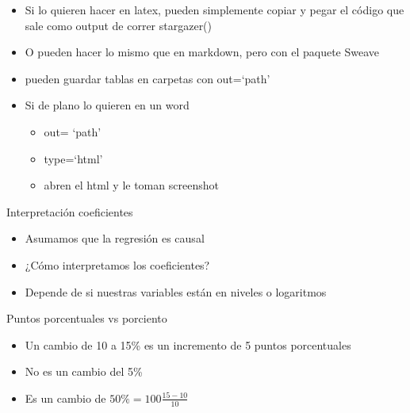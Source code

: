 \documentclass[
  ignorenonframetext,
]{beamer}
\providecommand{\tightlist}{%
  \setlength{\itemsep}{0pt}\setlength{\parskip}{0pt}}
\begin{document}
\begin{frame}{}
\protect\hypertarget{section-44}{}
\begin{itemize}
\tightlist
\item
  Si lo quieren hacer en latex, pueden simplemente copiar y pegar el
  código que sale como output de correr stargazer()
\item
  O pueden hacer lo mismo que en markdown, pero con el paquete Sweave
\end{itemize}
\end{frame}

\begin{frame}{}
\protect\hypertarget{section-45}{}
\begin{itemize}
\tightlist
\item
  pueden guardar tablas en carpetas con out=`path'
\item
  Si de plano lo quieren en un word

  \begin{itemize}
  \tightlist
  \item
    out= `path'
  \item
    type=`html'
  \item
    abren el html y le toman screenshot
  \end{itemize}
\end{itemize}
\end{frame}

\begin{frame}{Interpretación coeficientes}
\protect\hypertarget{interpretaciuxf3n-coeficientes}{}
\begin{itemize}
\tightlist
\item
  Asumamos que la regresión es causal
\item
  ¿Cómo interpretamos los coeficientes?
\item
  Depende de si nuestras variables están en niveles o logaritmos
\end{itemize}
\end{frame}

\begin{frame}{Puntos porcentuales vs porciento}
\protect\hypertarget{puntos-porcentuales-vs-porciento}{}
\begin{itemize}
\tightlist
\item
  Un cambio de 10 a 15\% es un incremento de 5 puntos porcentuales
\item
  No es un cambio del 5\%
\item
  Es un cambio de \(50 \% = 100 \frac{15-10}{10}\)
\end{itemize}
\end{frame}
\end{document}
